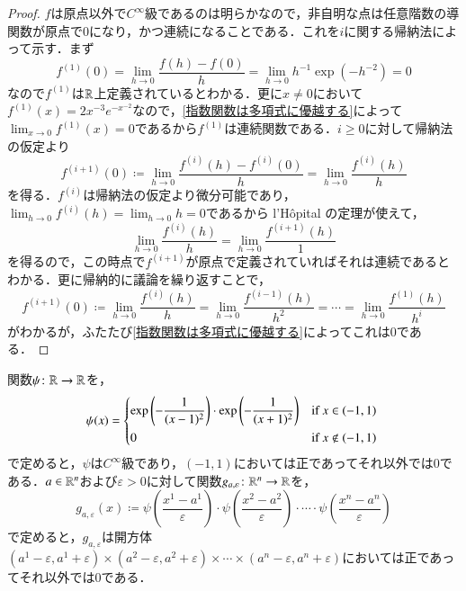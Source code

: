 \begin{proof}
$f$は原点以外で$C^\infty$級であるのは明らかなので，非自明な点は任意階数の導関数が原点で0になり，かつ連続になることである．これを$i$に関する帰納法によって示す．まず
\begin{equation}
f^{(1)}(0) = \lim_{h \to 0} \frac{f(h)-f(0)}{h} = \lim_{h \to 0} h^{-1} \exp(-h^{-2})=0
\end{equation}なので$f^{(1)}$は$\mathbb{R}$上定義されているとわかる．更に$x \neq 0$において$f^{(1)}(x) = 2x^{-3} e^{-x^{-2}}$なので，\cref{指数関数は多項式に優越する}によって$\lim_{x \to 0} f^{(1)}(x) = 0$であるから$f^{(1)}$は連続関数である．$i \geq 0$に対して帰納法の仮定より
\begin{equation}
f^{(i+1)}(0) \coloneqq \lim_{h\to 0 } \frac{f^{(i)}(h) - f^{(i)}(0)}{h} = \lim_{h\to 0}\frac{f^{(i)}(h)}{h}
\end{equation}を得る．$f^{(i)}$は帰納法の仮定より微分可能であり，$\lim_{h \to 0} f^{(i)}(h) = \lim_{h \to 0}h =0$であるから l'H\^opital の定理が使えて，
\begin{equation}
\lim_{h\to 0}\frac{f^{(i)}(h)}{h} = \lim_{h\to 0}\frac{f^{(i+1)}(h)}{1}
\end{equation}を得るので，この時点で$f^{(i+1)}$が原点で定義されていればそれは連続であるとわかる．更に帰納的に議論を繰り返すことで，
\begin{equation}
f^{(i+1)}(0) \coloneqq \lim_{h\to 0}\frac{f^{(i)}(h)}{h}  = \lim_{h\to 0}\frac{f^{(i-1)}(h)}{h^2} = \cdots = \lim_{h\to 0}\frac{f^{(1)}(h)}{h^i}
\end{equation}がわかるが，ふたたび\cref{指数関数は多項式に優越する}によってこれは0である．
\end{proof}


\begin{prop}\label{開方体上の隆起関数}
関数$\psi \colon \mathbb{R} \to \mathbb{R}$を，
\begin{equation}
\psi(x) =   \begin{dcases*}
    \exp\left(-\frac{1}{(x-1)^2}\right) \cdot \exp\left(-\frac{1}{(x+1)^2}\right)  & if $x \in (-1,1)$ \\
    0 & if $x \notin (-1,1)$
  \end{dcases*}
\end{equation}
で定めると，$\psi$は$C^\infty$級であり，$(-1,1)$においては正であってそれ以外では0である．$a \in \mathbb{R}^n$および$\varepsilon > 0$に対して関数$g_{a,\varepsilon} \colon \mathbb{R}^n \to \mathbb{R}$を，
\begin{equation}
g_{a,\varepsilon}(x) \coloneqq \psi\left( \frac{x^1 - a^1}{\varepsilon} \right) \cdot 
\psi\left( \frac{x^2 - a^2}{\varepsilon} \right) \cdot \cdots \cdot
\psi\left( \frac{x^n - a^n}{\varepsilon} \right)
\end{equation}で定めると，$g_{a,\varepsilon}$は開方体$(a^1- \varepsilon, a^1 + \varepsilon) \times(a^2- \varepsilon, a^2 + \varepsilon) \times \cdots \times (a^n- \varepsilon, a^n + \varepsilon)$においては正であってそれ以外では0である．
\end{prop}

